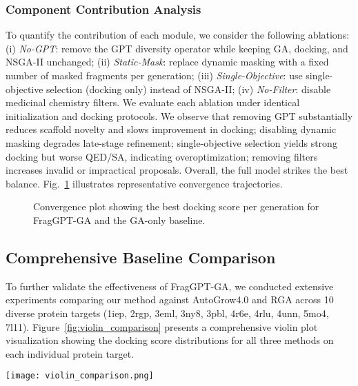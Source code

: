 \documentclass[lettersize,journal]{IEEEtran}
\begin{document}
\subsubsection{Component Contribution Analysis}
To quantify the contribution of each module, we consider the following ablations: (i) \textit{No-GPT}: remove the GPT diversity operator while keeping GA, docking, and NSGA-II unchanged; (ii) \textit{Static-Mask}: replace dynamic masking with a fixed number of masked fragments per generation; (iii) \textit{Single-Objective}: use single-objective selection (docking only) instead of NSGA-II; (iv) \textit{No-Filter}: disable medicinal chemistry filters. We evaluate each ablation under identical initialization and docking protocols. We observe that removing GPT substantially reduces scaffold novelty and slows improvement in docking; disabling dynamic masking degrades late-stage refinement; single-objective selection yields strong docking but worse QED/SA, indicating overoptimization; removing filters increases invalid or impractical proposals. Overall, the full model strikes the best balance. Fig.~\ref{fig:convergence} illustrates representative convergence trajectories.
\begin{figure}[!t]
\centering
\caption{Convergence plot showing the best docking score per generation for FragGPT-GA and the GA-only baseline.}
\label{fig:convergence}
\end{figure}
\subsection{Comprehensive Baseline Comparison}
To further validate the effectiveness of FragGPT-GA, we conducted extensive experiments comparing our method against AutoGrow4.0 and RGA across 10 diverse protein targets (1iep, 2rgp, 3eml, 3ny8, 3pbl, 4r6e, 4rlu, 4unn, 5mo4, 7l11). Figure~\ref{fig:violin_comparison} presents a comprehensive violin plot visualization showing the docking score distributions for all three methods on each individual protein target.

\begin{figure*}[!t]
\centering
\texttt{[image: violin\_comparison.png]}
\caption{Docking Score Comparison Across Three Models for 10 Protein Targets. Each subplot represents one protein target, with three violin plots showing the distribution of docking scores for AutoGrow4.0 (green), RGA (pink), and FragGPT-GA (blue). The violin plots display both population density and individual data points with statistical overlays (red lines: means, blue lines: medians). The top-right corner of each subplot shows the best docking score (TOP1) achieved by each model for that specific protein target. FragGPT-GA consistently demonstrates superior performance across most protein targets, achieving the best TOP1 scores while maintaining population diversity.}
\label{fig:violin_comparison}
\end{figure*}
\end{document}
